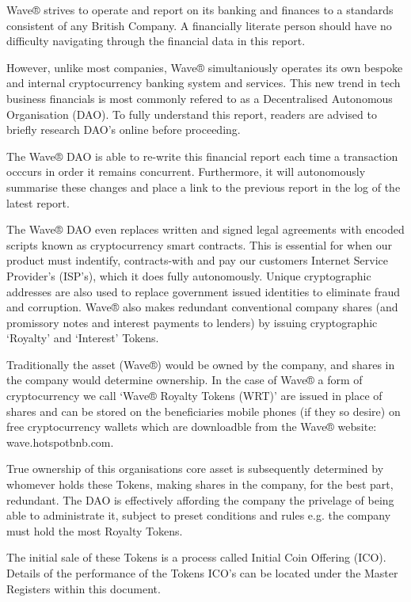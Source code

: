 \documentclass[letterpaper,10pt,openany,oneside,english]{sphinxmanual}
\begin{document}
Wave® strives to operate and report on its banking and finances to a standards consistent of any British Company.
A financially literate person should have no difficulty navigating through the financial data in this report.

However, unlike most companies, Wave® simultaniously operates its own bespoke and internal cryptocurrency banking system and services.
This new trend in tech business financials is most commonly refered to as a Decentralised Autonomous Organisation (DAO).
To fully understand this report, readers are advised to briefly research DAO’s online before proceeding.

The Wave® DAO is able to re-write this financial report each time a transaction occcurs in order it remains concurrent.
Furthermore, it will autonomously summarise these changes and place a link to the previous report in the log of the latest report.

The Wave® DAO even replaces written and signed legal agreements with encoded scripts known as cryptocurrency smart contracts.
This is essential for when our product must indentify, contracts-with and pay our customers Internet Service Provider’s (ISP’s), which it does fully autonomously.
Unique cryptographic addresses are also used to replace government issued identities to eliminate fraud and corruption.
Wave® also makes redundant conventional company shares (and promissory notes and interest payments to lenders) by issuing cryptographic ‘Royalty’ and ‘Interest’ Tokens.

Traditionally the asset (Wave®) would be owned by the company, and shares in the company would determine ownership.
In the case of Wave® a form of cryptocurrency we call ‘Wave® Royalty Tokens (WRT)’ are issued in place of shares and can be stored on the beneficiaries mobile phones (if they so desire) on free cryptocurrency wallets which are downloadble from the Wave®  website: wave.hotspotbnb.com.

True ownership of this organisations core asset is subsequently determined by whomever holds these Tokens, making shares in the company, for the best part, redundant.
The DAO is effectively affording the company the privelage of being able to administrate it, subject to preset conditions and rules e.g. the company must hold the most Royalty Tokens.

The initial sale of these Tokens is a process called Initial Coin Offering (ICO).
Details of the performance of the Tokens ICO’s can be located under the Master Registers within this document.
\end{document}
